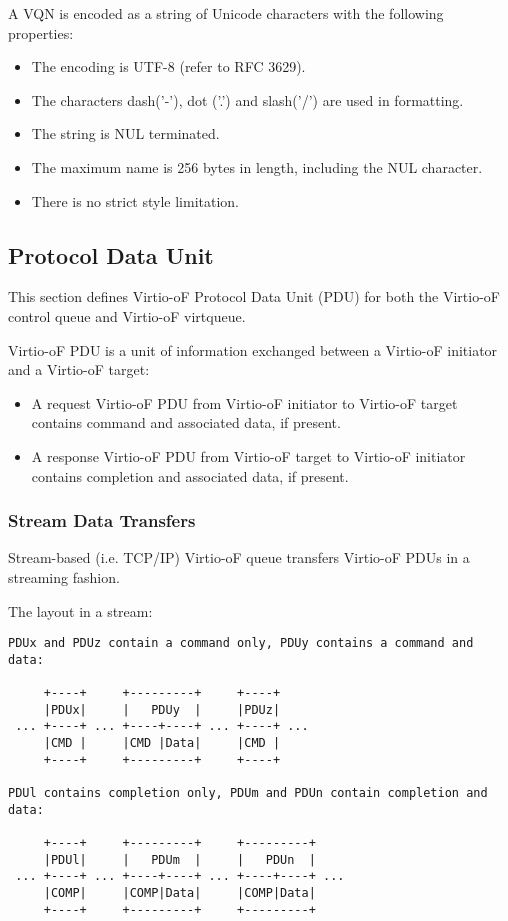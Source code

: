 A VQN is encoded as a string of Unicode characters with the following properties:

\begin{itemize}
\item The encoding is UTF-8 (refer to RFC 3629).
\item The characters dash('-'), dot ('.') and slash('/') are used in formatting.
\item The string is NUL terminated.
\item The maximum name is 256 bytes in length, including the NUL character.
\item There is no strict style limitation.
\end{itemize}


\subsection{Protocol Data Unit}\label{sec:Virtio Transport Options / Virtio Over Fabrics / Protocol Data Unit}
This section defines Virtio-oF Protocol Data Unit (PDU) for both the Virtio-oF control queue and Virtio-oF virtqueue.

Virtio-oF PDU is a unit of information exchanged between a Virtio-oF initiator and a Virtio-oF target:
\begin{itemize}
\item A request Virtio-oF PDU from Virtio-oF initiator to Virtio-oF target contains command and associated data, if present.
\item A response Virtio-oF PDU from Virtio-oF target to Virtio-oF initiator contains completion and associated data, if present.
\end{itemize}

\subsubsection{Stream Data Transfers}\label{sec:Virtio Transport Options / Virtio Over Fabrics / Protocol Data Unit/ Stream Data Transfers}
Stream-based (i.e. TCP/IP) Virtio-oF queue transfers Virtio-oF PDUs in a streaming fashion.

The layout in a stream:
\begin{lstlisting}
PDUx and PDUz contain a command only, PDUy contains a command and data:

     +----+     +---------+     +----+
     |PDUx|     |   PDUy  |     |PDUz|
 ... +----+ ... +----+----+ ... +----+ ...
     |CMD |     |CMD |Data|     |CMD |
     +----+     +---------+     +----+

PDUl contains completion only, PDUm and PDUn contain completion and data:

     +----+     +---------+     +---------+
     |PDUl|     |   PDUm  |     |   PDUn  |
 ... +----+ ... +----+----+ ... +----+----+ ...
     |COMP|     |COMP|Data|     |COMP|Data|
     +----+     +---------+     +---------+
\end{lstlisting}

